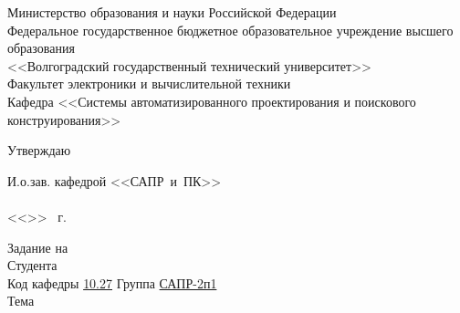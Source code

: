 \begin{titlepage}
    \begin{center}
        Министерство образования и науки Российской Федерации \\
        Федеральное государственное бюджетное образовательное учреждение высшего образования\\
        <<Волгоградский государственный технический университет>>\\
        Факультет электроники и вычислительной техники\\
        Кафедра <<Системы автоматизированного проектирования и поискового конструирования>>
    \end{center}
    \begin{flushright}
        \begin{center}
            \hspace*{9.7em}Утверждаю
        \end{center}
        И.о.зав. кафедрой <<САПР~и~ПК>>\\
        \hspace{0.5em}\\
        \vspace{0.5em}<<\underline{\hspace{2em}}>> \underline{\hspace{8.5em}} \the\year\ г.
        \vspace{1em}
    \end{flushright}
    Задание на 
        {}\\
    Студента \\
    Код кафедры \vspace{1em}\underline{\hspace{2em}10.27\hspace{5em}}\quad\qquad
    Группа \underline{\hspace{3em}САПР-2п1\hspace{5em}}\\
    Тема \vspace{0.5em}\underline{}\\

\end{titlepage}
